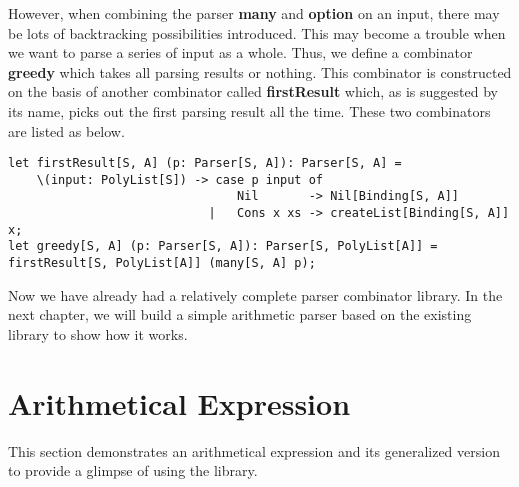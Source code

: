 However, when combining the parser \textbf{many} and \textbf{option} on an input, there may be lots of backtracking possibilities introduced. This may become a trouble when we want to parse a series of input as a whole. Thus, we define a combinator \textbf{greedy} which takes all parsing results or nothing. This combinator is constructed on the basis of another combinator called \textbf{firstResult} which, as is suggested by its name, picks out the first parsing result all the time. These two combinators are listed as below.
\begin{lstlisting}
let firstResult[S, A] (p: Parser[S, A]): Parser[S, A] =
	\(input: PolyList[S]) -> case p input of
								Nil 	  -> Nil[Binding[S, A]]
							|	Cons x xs -> createList[Binding[S, A]] x;
let greedy[S, A] (p: Parser[S, A]): Parser[S, PolyList[A]] = firstResult[S, PolyList[A]] (many[S, A] p);
\end{lstlisting}
Now we have already had a relatively complete parser combinator library. In the next chapter, we will build a simple arithmetic parser based on the existing library to show how it works.

\section{Arithmetical Expression}
This section demonstrates an arithmetical expression and its generalized version to provide a glimpse of using the library.

